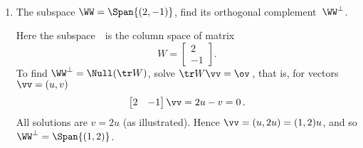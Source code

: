 \begin{example} \label{eg:nulltrw}
\ 
\begin{enumerate}
\item\label{eg:nulltrw:a} The subspace \(\WW=\Span\{(2,-1)\}\), find its orthogonal complement~\(\WW^\perp\). 
\begin{solution} 
Here the subspace~\WW\ is the column space of matrix
\begin{equation*}
W=\begin{bmatrix} 2\\-1 \end{bmatrix}.
\end{equation*}
To find \(\WW^\perp=\Null(\tr W)\), solve \(\tr W\vv=\ov\)\,, that is, for vectors \(\vv=(u,v)\)
\begin{equation*}
\begin{bmatrix} 2&-1 \end{bmatrix}\vv=2u-v=0\,.
\end{equation*}
All solutions are \(v=2u\) (as illustrated).
Hence \(\vv=(u,2u)=(1,2)u\), and so \(\WW^\perp=\Span\{(1,2)\}\).
\end{solution}


\end{enumerate}
\end{example}
